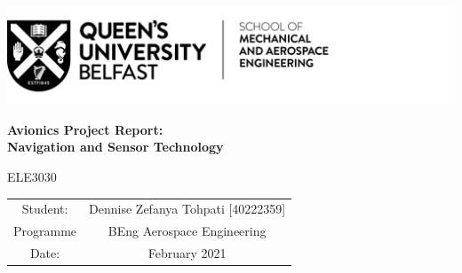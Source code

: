 \begin{titlepage}
\includegraphics[scale=1]{Figures/QUB LOGO - SMAE.png}
\centering

\vspace{7cm}
\textbf{Avionics Project Report:\\Navigation and Sensor Technology}

ELE3030

\vspace{2cm}


\vspace{8cm}
\begin{tabular}{cc}
    Student: &  \quad Dennise Zefanya Tohpati [40222359]\\
    Programme & \quad BEng Aerospace Engineering\\
    Date: & \quad 26 February 2021
    
    
\end{tabular}
\end{titlepage}
